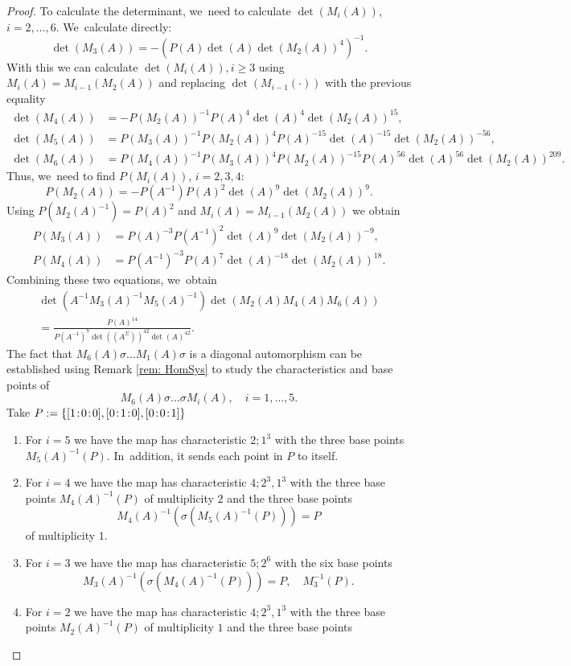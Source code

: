 \documentclass[10pt,a4paper]{amsart}
\newcommand{\sep}{\mkern2mu{:}\mkern2mu}
\theoremstyle{definition}
\begin{document}
\begin{proof}
To calculate the determinant, we~need to calculate $\det(M_i(A))$, $i=2, \dots , 6$. We~calculate directly:
\[
\det(M_3(A))=-(P(A)\det(A)\det(M_2(A))^4)^{-1}.
\]
With this we can calculate $\det(M_i(A)), i \geq 3$ using $M_i(A) = M_{i-1}(M_2(A))$ and replacing $\det(M_{i-1}(\cdot))$ with the previous equality
\begin{align*}
\det(M_4(A))&=-P(M_2(A))^{-1}P(A)^4\det(A)^4\det(M_2(A))^{15},
\\
\det(M_5(A))&=P(M_3(A))^{-1}P(M_2(A))^4P(A)^{-15}\det(A)^{-15}\det(M_2(A))^{-56},
\\
\det(M_6(A))&=P(M_4(A))^{-1}P(M_3(A))^4P(M_2(A))^{-15}P(A)^{56}\det(A)^{56}\det(M_2(A))^{209}.
\end{align*}
Thus, we~need to find $P(M_i(A))$, $i=2,3,4$:
\[
P(M_2(A)) = -P(A^{-1})P(A)^2\det(A)^9\det(M_2(A))^9.
\]
Using $P(M_2(A)^{-1}) = P(A)^2$ and $M_i(A) = M_{i-1}(M_2(A))$ we obtain
\begin{align*}
P(M_3(A)) &= P(A)^{-3}P(A^{-1})^2\det(A)^9\det(M_2(A))^{-9},
\\
P(M_4(A))&=P(A^{-1})^{-3}P(A)^7\det(A)^{-18}\det(M_2(A))^{18}.
\end{align*}
Combining these two equations, we~obtain
\begin{multline*}
\det(A^{-1}M_3(A)^{-1}M_5(A)^{-1})\det(M_2(A)M_4(A)M_6(A))
\\
= \frac{P(A)^{14}}{P(A^{-1})^7 \det((A^{\Sigma}))^{42}\det(A)^{42}}.
\end{multline*}
The fact that $M_6(A) \sigma \dots M_1(A) \sigma$ is a diagonal automorphism can be established using Remark \ref{rem: HomSys} to study the characteristics and base points of
\[
M_6(A) \sigma \dots \sigma M_i(A),\quad i = 1, \dots , 5.
\]
Take $P := \{[1\sep 0\sep 0],[0\sep 1\sep 0],[0\sep 0\sep 1]\}$
\begin{enumerate}
\item For $i = 5$ we have the map has characteristic $2;1^3$ with the three base points $M_5(A)^{-1}(P)$. In~addition, it sends each point in $P$ to itself.
\item For $i = 4$ we have the map has characteristic $4;2^3,1^3$ with the three base points $M_4(A)^{-1}(P)$ of multiplicity $2$ and the three base points
\[
M_4(A)^{-1}(\sigma(M_5(A)^{-1}(P))) = P
\]
of multiplicity $1$.
\item For $i = 3$ we have the map has characteristic $5;2^6$ with the six base points
\[
M_3(A)^{-1}(\sigma(M_4(A)^{-1}(P))) = P, \quad M_3^{-1}(P).
\]
\item For $i = 2$ we have the map has characteristic $4;2^3,1^3$ with the three base points $M_2(A)^{-1}(P)$ of multiplicity $1$ and the three base points

\end{enumerate}
\end{proof}
\end{document}
